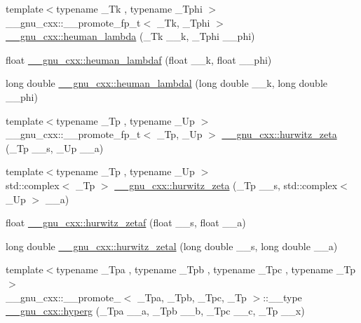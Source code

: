 \begin{DoxyCompactItemize}
\item 
{\footnotesize template$<$typename \+\_\+\+Tk , typename \+\_\+\+Tphi $>$ }\\\+\_\+\+\_\+gnu\+\_\+cxx\+::\+\_\+\+\_\+promote\+\_\+fp\+\_\+t$<$ \+\_\+\+Tk, \+\_\+\+Tphi $>$ \hyperlink{group__gnu__math__spec__func_gab73b2a75a662785fa102926dca3be59f}{\+\_\+\+\_\+gnu\+\_\+cxx\+::heuman\+\_\+lambda} (\+\_\+\+Tk \+\_\+\+\_\+k, \+\_\+\+Tphi \+\_\+\+\_\+phi)
\item 
float \hyperlink{group__gnu__math__spec__func_ga10cf5d54d985aa3a58cb197601040ac8}{\+\_\+\+\_\+gnu\+\_\+cxx\+::heuman\+\_\+lambdaf} (float \+\_\+\+\_\+k, float \+\_\+\+\_\+phi)
\item 
long double \hyperlink{group__gnu__math__spec__func_gadadaeb83b3d9c2fccd33ab8ec3188df5}{\+\_\+\+\_\+gnu\+\_\+cxx\+::heuman\+\_\+lambdal} (long double \+\_\+\+\_\+k, long double \+\_\+\+\_\+phi)
\item 
{\footnotesize template$<$typename \+\_\+\+Tp , typename \+\_\+\+Up $>$ }\\\+\_\+\+\_\+gnu\+\_\+cxx\+::\+\_\+\+\_\+promote\+\_\+fp\+\_\+t$<$ \+\_\+\+Tp, \+\_\+\+Up $>$ \hyperlink{group__gnu__math__spec__func_ga19b3014d94dd102c59a5c7776474be41}{\+\_\+\+\_\+gnu\+\_\+cxx\+::hurwitz\+\_\+zeta} (\+\_\+\+Tp \+\_\+\+\_\+s, \+\_\+\+Up \+\_\+\+\_\+a)
\item 
{\footnotesize template$<$typename \+\_\+\+Tp , typename \+\_\+\+Up $>$ }\\std\+::complex$<$ \+\_\+\+Tp $>$ \hyperlink{group__gnu__math__spec__func_gaa7f0d1fbba9d2ce07a30d907302d527f}{\+\_\+\+\_\+gnu\+\_\+cxx\+::hurwitz\+\_\+zeta} (\+\_\+\+Tp \+\_\+\+\_\+s, std\+::complex$<$ \+\_\+\+Up $>$ \+\_\+\+\_\+a)
\item 
float \hyperlink{group__gnu__math__spec__func_gaa745d7f2edde060ed2f22817ad89df1f}{\+\_\+\+\_\+gnu\+\_\+cxx\+::hurwitz\+\_\+zetaf} (float \+\_\+\+\_\+s, float \+\_\+\+\_\+a)
\item 
long double \hyperlink{group__gnu__math__spec__func_gad8f2cfc7e198755968bae35d46b49d5a}{\+\_\+\+\_\+gnu\+\_\+cxx\+::hurwitz\+\_\+zetal} (long double \+\_\+\+\_\+s, long double \+\_\+\+\_\+a)
\item 
{\footnotesize template$<$typename \+\_\+\+Tpa , typename \+\_\+\+Tpb , typename \+\_\+\+Tpc , typename \+\_\+\+Tp $>$ }\\\+\_\+\+\_\+gnu\+\_\+cxx\+::\+\_\+\+\_\+promote\+\_$<$ \+\_\+\+Tpa, \+\_\+\+Tpb, \+\_\+\+Tpc, \+\_\+\+Tp $>$\+::\+\_\+\+\_\+type \hyperlink{group__gnu__math__spec__func_gaf52cf49736c63b0bb000be98b53c221f}{\+\_\+\+\_\+gnu\+\_\+cxx\+::hyperg} (\+\_\+\+Tpa \+\_\+\+\_\+a, \+\_\+\+Tpb \+\_\+\+\_\+b, \+\_\+\+Tpc \+\_\+\+\_\+c, \+\_\+\+Tp \+\_\+\+\_\+x)

\end{DoxyCompactItemize}
